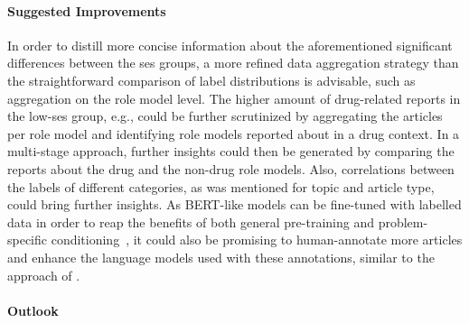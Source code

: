 \paragraph{Suggested Improvements}
% 
In order to distill more concise information about the aforementioned significant differences between the \gls{ses} groups, a more refined data aggregation strategy than the straightforward comparison of label distributions is advisable, such as aggregation on the role model level. The higher amount of drug-related reports in the low-\gls{ses} group, e.g., could be further scrutinized by aggregating the articles per role model and identifying role models reported about in a drug context. In a multi-stage approach, further insights could then be generated by comparing the reports about the drug and the non-drug role models. Also, correlations between the labels of different categories, as was mentioned for topic and article type, could bring further insights. As BERT-like models can be fine-tuned with labelled data in order to reap the benefits of both general pre-training and problem-specific conditioning~\autocite{devlin_bert_2019}, it could also be promising to human-annotate more articles and enhance the language models used with these annotations, similar to the approach of \textcite{fenske_using_2022}.


\paragraph{Outlook}